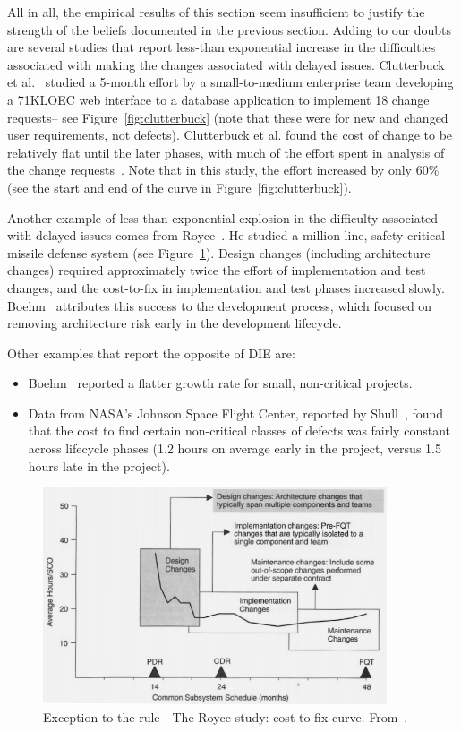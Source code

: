 \documentclass[smallcondesed]{svjour3}
\newcommand{\bi}{\begin{itemize}}%
\newcommand{\ei}{\end{itemize}}
\begin{document}
 All in all, the empirical results of this section seem insufficient to justify
 the strength of the beliefs documented in the previous section. Adding to our doubts are  several studies that report less-than exponential
 increase in the difficulties associated with making the changes associated with delayed
 issues. 
Clutterbuck et al.~\cite{Clutterbuck09} studied a 5-month effort by a small-to-medium enterprise team developing a 71KLOEC web interface to a database application to implement 18 change requests-- see Figure~\ref{fig:clutterbuck} (note that these were for new and changed user requirements, not defects). Clutterbuck et al. found the cost of change to be relatively flat until the later phases, with much of the effort spent in analysis of the change requests~\cite{Clutterbuck09}. Note that in this study, the effort increased by only 60\% (see the start and end of the curve in Figure~\ref{fig:clutterbuck}).




 
Another example of less-than exponential explosion in the difficulty associated with delayed issues comes from  Royce~\cite{Royce98}. He
studied  a million-line, safety-critical missile defense system
(see  Figure~\ref{fig:royce}). Design changes (including architecture changes) required approximately twice the effort of implementation and test changes, and the cost-to-fix in implementation and test phases increased slowly. Boehm~\cite{Boehm10} attributes this success to the  development process, which focused on removing architecture risk early in the development lifecycle.
 
 Other examples that report the opposite of DIE are:
  \bi
  \item
  Boehm~\cite{Boehm80} reported a flatter growth rate for small, non-critical projects.
   \item 
  Data from NASA's Johnson Space Flight Center, reported by Shull~\cite{Shull02}, found that the cost to find certain non-critical classes of defects was fairly constant across lifecycle phases (1.2 hours on average early in the project, versus 1.5 hours late in the project). 
   
\ei


\begin{figure}
\begin{center}\includegraphics[width=4in]{img/Royce98.png}\end{center}
 \caption{Exception to the rule - The Royce study: cost-to-fix curve. From~\cite{Royce98}.}\label{fig:royce}
 \end{figure}
\end{document}

